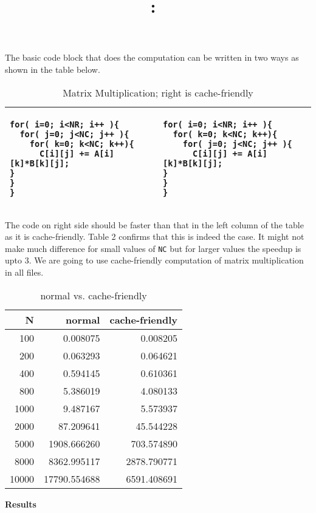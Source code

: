 \documentclass{article}
\title{
	\vspace{2in}
	\textmd{\textbf{\hmwkClass:\ \hmwkTitle}}\\
	\vspace{3in}
}
\author{\textbf{\hmwkAuthorName}}
\date{} %
\begin{document}


The basic code block that does the computation can be written in two ways
as shown in the table below. 
\begin{table}[h]

	\caption{Matrix Multiplication; right is cache-friendly}
	\begin{center}
	\begin{tabular}{| l | l |}

			\hline 
			\begin{lstlisting}
for( i=0; i<NR; i++ ){
  for( j=0; j<NC; j++ ){
    for( k=0; k<NC; k++){
	  C[i][j] += A[i][k]*B[k][j];
}
}
}
			\end{lstlisting} 
			&
			\begin{lstlisting}
for( i=0; i<NR; i++ ){
  for( k=0; k<NC; k++){
    for( j=0; j<NC; j++ ){
	  C[i][j] += A[i][k]*B[k][j];
}
}
}
			\end{lstlisting} \\ 
			\hline

		\end{tabular}
	\end{center}

\end{table}
The code on right side should be faster than that in 
the left column of the table as it is cache-friendly. Table 2 confirms that this is indeed the case. It might not make
much difference for small values of \verb+NC+ but for larger values
the speedup is upto 3. We are going to use cache-friendly computation of matrix multiplication
in all files.

\begin{table}[h]
	\caption{normal vs. cache-friendly }
	\begin{center}
	\begin{tabular}{| r | r | r |}
		\hline
		N & normal & cache-friendly \\ \hline
		100&0.008075 & 0.008205 \\ \hline
		200&0.063293&0.064621 \\ \hline
		400&0.594145&0.610361 \\ \hline
		800&5.386019&4.080133 \\ \hline
		1000&9.487167&5.573937 \\ \hline
		2000&87.209641&45.544228 \\ \hline
		5000&1908.666260&703.574890 \\ \hline
		8000&8362.995117&2878.790771 \\ \hline
		10000&17790.554688&6591.408691 \\ \hline
	\end{tabular}
\end{center}
\end{table}
\newpage
\textbf{Results}
\end{document}
